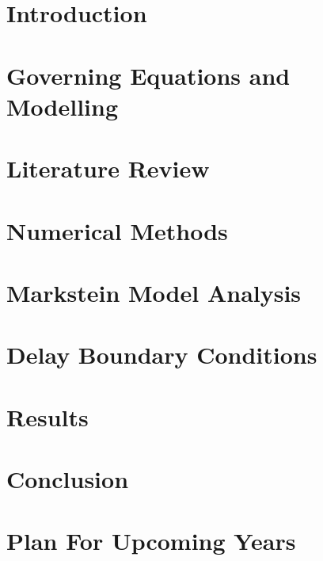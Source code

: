 \documentclass[lmr,second,hyperref,rgb,hyperref,dvipsnames]{uom_thesis_casson}
\title{\xmp@Title}
\author{\xmp@Author}
\begin{document}
\maketitle



\uomtoc

\uomstartmainbody %

\chapter{Introduction} \label{ch:intro}


\chapter{Governing Equations and Modelling} \label{ch:govern-eqns}


\chapter{Literature Review} \label{ch:lit-review}


\chapter{Numerical Methods} \label{ch:techniques}


\chapter{Markstein Model Analysis} \label{ch:markstein}


\chapter{Delay Boundary Conditions} \label{ch:delay-bcs}


\chapter{Results} \label{ch:delay-bcs-results}


\chapter{Conclusion} \label{ch:conc}


\chapter{Plan For Upcoming Years} \label{ch:plan}



\printbibliography[title={References},heading=bibintoc]
\end{document}
